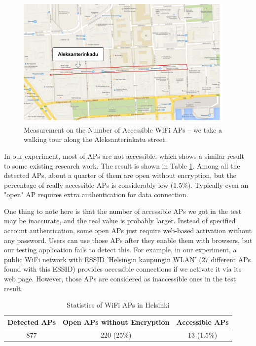 \documentclass[english]{tktltiki}
\begin{document}
\begin{figure}[htbp]
  \centering
  \includegraphics[width=0.95\textwidth]{images/map.png}
  \caption{Measurement on the Number of Accessible WiFi APs -- we take a walking tour along the Aleksanterinkatu street.}
  \label{fig:map}
\end{figure}

In our experiment, most of APs are not accessible, which shows a similar result to some existing research work. The result is shown in Table \ref{tab:stat-ap}. Among all the detected APs, about a quarter of them are open without encryption, but the percentage of really accessible APs is considerably low (1.5\%). Typically even an "open" AP requires extra authentication for data connection.

One thing to note here is that the number of accessible APs we got in the test may be inaccurate, and the real value is probably larger. Instead of specified account authentication, some open APs just require web-based activation without any password. Users can use those APs after they enable them with browsers, but our testing application fails to detect this. For example, in our experiment, a public WiFi network with ESSID 'Helsingin kaupungin WLAN' (27 different APs found with this ESSID) provides accessible connections if we activate it via its web page. However, those APs are considered as inaccessible ones in the test result.


\begin{table}[htbp]
\centering
\begin{tabular}{|c|c|c|}
  \hline
  Detected APs & Open APs without Encryption & Accessible APs \\
  \hline
  877 & 220 (25\%) & 13 (1.5\%)\footnotemark[9] \\
  \hline
\end{tabular}
\caption{Statistics of WiFi APs in Helsinki}
\label{tab:stat-ap}
\end{table}
\end{document}
